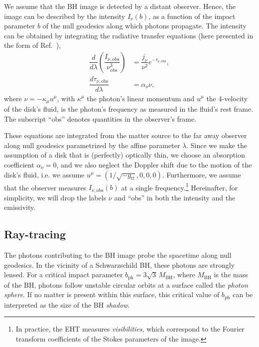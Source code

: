 \documentclass[%
nofootinbib,
 amsmath,amssymb,
 aps,
floatfix,
twocolumn
]{revtex4-2}
\begin{document}
We assume that the BH image is detected 
by a distant observer. 
Hence, the image can be described by the intensity \(I_\nu (b)\), as a function of the impact parameter \(b\) of the null geodesics along which photons propagate. The intensity can be obtained by integrating the radiative transfer equations (here presented in the form of Ref.~\cite{Younsi_2012,RezzollaYounsiBronzwaer:2018lde}),
%
\begin{align}\label{eq: RTeqs}
    \dfrac{d}{d \lambda} \left(\dfrac{I_{\nu, \text{obs}}}{\nu_\text{obs}^3}\right) & = \dfrac{j_\nu}{\nu^2} e^{-\tau_{\nu, \text{obs}}}, \\
    \dfrac{d \tau_{\nu, \text{obs}}}{d\lambda} & = \alpha_\nu \nu,
\end{align}
%
where \(\nu = - \kappa_\mu u^\mu\), 
with \(\kappa^\mu\) the photon's linear momentum and
 \(u^\mu\) the 4-velocity of the disk's fluid, is the photon's frequency as measured in the fluid's rest frame.
The subscript ``obs'' denotes quantities in the observer's frame.
%

These equations are integrated from the matter source to the far away observer along  null geodesics
parametrized by the affine parameter \(\lambda\). Since we make the assumption of a disk that is (perfectly)
optically thin, we choose an absorption coefficient \(\alpha_\nu = 0\), and we also
neglect the Doppler shift due to the motion of the disk's fluid, i.e. we assume 
\(u^{\mu} = (1/\sqrt{-g_{tt}}, 0, 0, 0)\). Furthermore, we assume that  the observer  measures \(I_{\nu, \text{obs}}(b)\) at a single  frequency.\footnote{In practice, the EHT measures \emph{visibilities}, which correspond to the Fourier transform coefficients of the Stokes parameters of the image.} Hereinafter, for simplicity, we will drop the labels \(\nu\) and ``obs'' in both the intensity and the emissivity.

\subsection{Ray-tracing}\label{theory_ray}

The photons contributing to the BH image probe the spacetime along null geodesics. In the vicinity of a Schwarzschild BH, these photons are strongly lensed. For a critical impact parameter \(b_\text{ph} = 3 \sqrt{3} \, M_\text{BH} \), where \(M_\text{BH}\) is the mass of the BH, photons follow unstable circular orbits at a surface called the \emph{photon sphere}. If no matter is present within this surface, this critical value of \(b_\text{ph} \) can be interpreted as the size of the BH \emph{shadow}. \cite{Gralla:2019xty}
\end{document}
